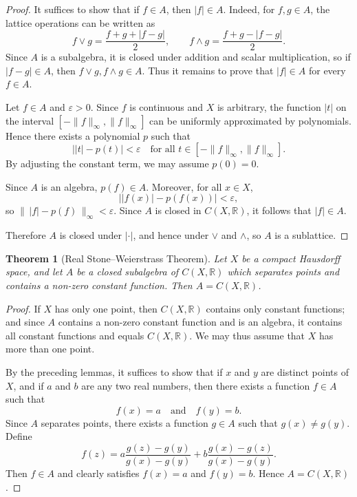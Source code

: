 \documentclass[12pt]{article}
\newtheorem{theorem}{Theorem}
\begin{document}
\begin{proof}
It suffices to show that if $f \in A$, then $|f| \in A$. Indeed, for $f,g \in A$,
the lattice operations can be written as
\[
f \vee g = \frac{f+g+|f-g|}{2}, \qquad
f \wedge g = \frac{f+g-|f-g|}{2}.
\]
Since $A$ is a subalgebra, it is closed under addition and scalar multiplication,
so if $|f-g| \in A$, then $f \vee g, f \wedge g \in A$. Thus it remains to prove that $|f| \in A$ for every $f \in A$.

Let $f \in A$ and $\varepsilon>0$. Since $f$ is continuous and $X$ is arbitrary,
the function $|t|$ on the interval $[-\|f\|_\infty,\|f\|_\infty]$ can be uniformly
approximated by polynomials. Hence there exists a polynomial $p$ such that
\[
\bigl||t|-p(t)\bigr|<\varepsilon \quad \text{for all } t \in [-\|f\|_\infty,\|f\|_\infty].
\]
By adjusting the constant term, we may assume $p(0)=0$.

Since $A$ is an algebra, $p(f) \in A$. Moreover, for all $x \in X$,
\[
\bigl||f(x)| - p(f(x))\bigr| < \varepsilon,
\]
so $\|\,|f| - p(f)\,\|_\infty < \varepsilon$. Since $A$ is closed in $C(X,\mathbb{R})$, it follows that $|f| \in A$.

Therefore $A$ is closed under $|\cdot|$, and hence under $\vee$ and $\wedge$,
so $A$ is a sublattice.
\end{proof}

\begin{theorem}[Real Stone--Weierstrass Theorem]
Let $X$ be a compact Hausdorff space, and let $A$ be a closed subalgebra of $C(X,\mathbb{R})$ which separates points and contains a non-zero constant function. Then $A = C(X,\mathbb{R})$.
\end{theorem}

\begin{proof}
If $X$ has only one point, then $C(X,\mathbb{R})$ contains only constant functions; and since $A$ contains a non-zero constant function and is an algebra, it contains all constant functions and equals $C(X,\mathbb{R})$. We may thus assume that $X$ has more than one point.

By the preceding lemmas, it suffices to show that if $x$ and $y$ are distinct points of $X$, and if $a$ and $b$ are any two real numbers, then there exists a function $f \in A$ such that
\[
f(x) = a \quad \text{and} \quad f(y) = b.
\]
Since $A$ separates points, there exists a function $g \in A$ such that $g(x) \neq g(y)$. Define
\[
f(z) = a \frac{g(z) - g(y)}{g(x) - g(y)} + b \frac{g(x) - g(z)}{g(x) - g(y)}.
\]
Then $f \in A$ and clearly satisfies $f(x) = a$ and $f(y) = b$. Hence $A = C(X,\mathbb{R})$.
\end{proof}
\end{document}
